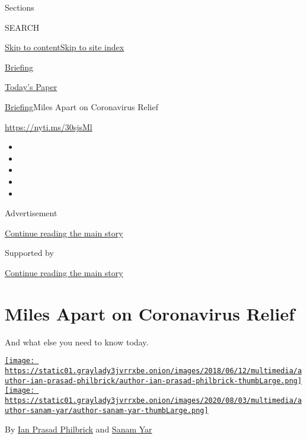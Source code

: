 Sections

SEARCH

\protect\hyperlink{site-content}{Skip to
content}\protect\hyperlink{site-index}{Skip to site index}

\href{https://www.nytimes3xbfgragh.onion/interactive/2018/briefing/global-morning-briefing-newsletter-signup.html}{Briefing}

\href{https://myaccount.nytimes3xbfgragh.onion/auth/login?response_type=cookie\&client_id=vi}{}

\href{https://www.nytimes3xbfgragh.onion/section/todayspaper}{Today's
Paper}

\href{/interactive/2018/briefing/global-morning-briefing-newsletter-signup.html}{Briefing}\textbar{}Miles
Apart on Coronavirus Relief

\url{https://nyti.ms/30sjsMl}

\begin{itemize}
\item
\item
\item
\item
\item
\end{itemize}

Advertisement

\protect\hyperlink{after-top}{Continue reading the main story}

Supported by

\protect\hyperlink{after-sponsor}{Continue reading the main story}

\hypertarget{miles-apart-on-coronavirus-relief}{%
\section{Miles Apart on Coronavirus
Relief}\label{miles-apart-on-coronavirus-relief}}

And what else you need to know today.

\href{https://www.nytimes3xbfgragh.onion/by/ian-prasad-philbrick}{\texttt{[image: https://static01.graylady3jvrrxbe.onion/images/2018/06/12/multimedia/author-ian-prasad-philbrick/author-ian-prasad-philbrick-thumbLarge.png]}}\href{https://www.nytimes3xbfgragh.onion/by/sanam-yar}{\texttt{[image: https://static01.graylady3jvrrxbe.onion/images/2020/08/03/multimedia/author-sanam-yar/author-sanam-yar-thumbLarge.png]}}

By \href{https://www.nytimes3xbfgragh.onion/by/ian-prasad-philbrick}{Ian
Prasad Philbrick} and
\href{https://www.nytimes3xbfgragh.onion/by/sanam-yar}{Sanam Yar}


